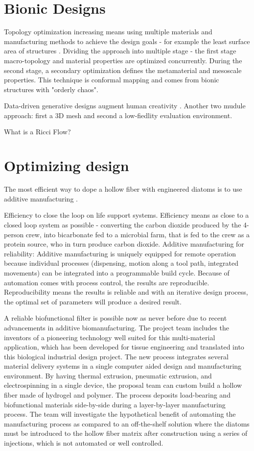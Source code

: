 \documentclass[a4paper,11pt]{article}
\begin{document}
\section{Bionic Designs}

Topology optimization increasing means using multiple materials and manufacturing methods to achieve the design goals - for example the least surface area of structures \cite{jiang2021generative}. Dividing the approach into multiple stage - the first stage macro-topology and material properties are optimized concurrently. During the second stage, a secondary optimization defines the metamaterial and mesoscale properties. This technique is conformal mapping and comes from bionic structures with "orderly chaos".

Data-driven generative designs augment human creativity \cite{li2021part}. Another two mudule approach: first a 3D mesh
and second a low-fiedlity evaluation environment.

What is a Ricci Flow?

\section{Optimizing design}

The most efficient way to dope a hollow fiber with engineered diatoms is to use additive manufacturing \cite{dalwadi2015understanding}.

Efficiency to close the loop on life support systems. Efficiency means as close to a closed loop system as possible - converting the carbon dioxide produced by the 4-person crew, into bicarbonate fed to a microbial farm, that is fed to the crew as a protein source, who in turn produce carbon dioxide.
Additive manufacturing for reliability: Additive manufacturing is uniquely equipped for remote operation because individual processes (dispensing, motion along a tool path, integrated movements) can be integrated into a programmable build cycle. Because of automation comes with process control, the results are reproducible. Reproducibility means the results is reliable and with an iterative design process, the optimal set of parameters will produce a desired result.

A reliable biofunctional filter is possible now as never before due to recent advancements in additive biomanufacturing. The project team includes the inventors of a pioneering technology well suited for this multi-material application, which has been developed for tissue engineering and translated into this biological industrial design project. The new process integrates several material delivery systems in a single computer aided design and manufacturing environment. By having thermal extrusion, pneumatic extrusion, and electrospinning in a single device, the proposal team can custom build a hollow fiber made of hydrogel and polymer. The process deposits load-bearing and biofunctional materials side-by-side during a layer-by-layer manufacturing process. The team will investigate the hypothetical benefit of automating the manufacturing process as compared to an off-the-shelf solution where the diatoms must be introduced to the hollow fiber matrix after construction using a series of injections, which is not automated or well controlled.
\end{document}
